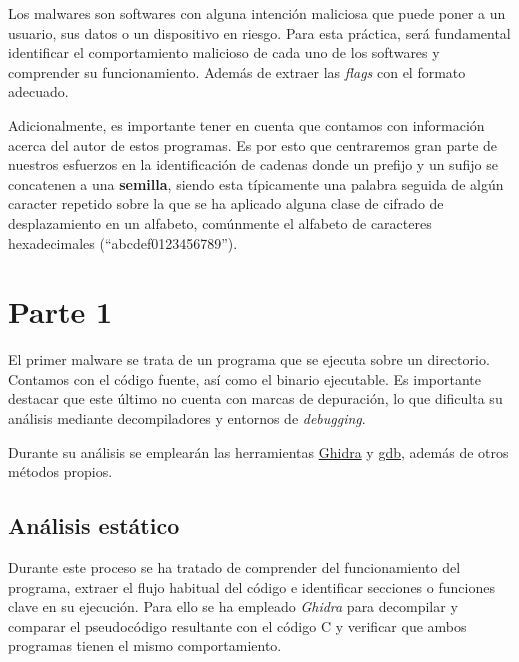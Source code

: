 \documentclass[]{article}
\begin{document}
Los malwares son softwares con alguna intención maliciosa que puede poner a un
usuario, sus datos o un dispositivo en riesgo. Para esta práctica, será
fundamental identificar el comportamiento malicioso de cada uno de los
softwares y comprender su funcionamiento. Además de extraer las \textit{flags}
con el formato adecuado.

Adicionalmente, es importante tener en cuenta que contamos con información
acerca del autor de estos programas. Es por esto que centraremos gran parte de
nuestros esfuerzos en la identificación de cadenas donde un prefijo y un sufijo
se concatenen a una \textbf{semilla}, siendo esta típicamente una palabra
seguida de algún caracter repetido sobre la que se ha aplicado alguna clase de
cifrado de desplazamiento en un alfabeto, comúnmente el alfabeto de caracteres
hexadecimales (``abcdef0123456789'').

\section{Parte 1}
\label{sec:type1}
El primer malware se trata de un programa que se ejecuta sobre un directorio.
Contamos con el código fuente, así como el binario ejecutable. Es importante
destacar que este último no cuenta con marcas de depuración, lo que dificulta
su análisis mediante decompiladores y entornos de \textit{debugging}.

Durante su análisis se emplearán las herramientas
\href{https://ghidra-sre.org/}{Ghidra} y
\href{https://man7.org/linux/man-pages/man1/gdb.1.html}{gdb}, además de otros
métodos propios.

\subsection{Análisis estático}
\label{subsec:analisis-estatico-1}

Durante este proceso se ha tratado de comprender del funcionamiento del
programa, extraer el flujo habitual del código e identificar secciones o
funciones clave en su ejecución. Para ello se ha empleado \textit{Ghidra} 
para decompilar y comparar el pseudocódigo resultante con el código C y
verificar que ambos programas tienen el mismo comportamiento.
\end{document}
